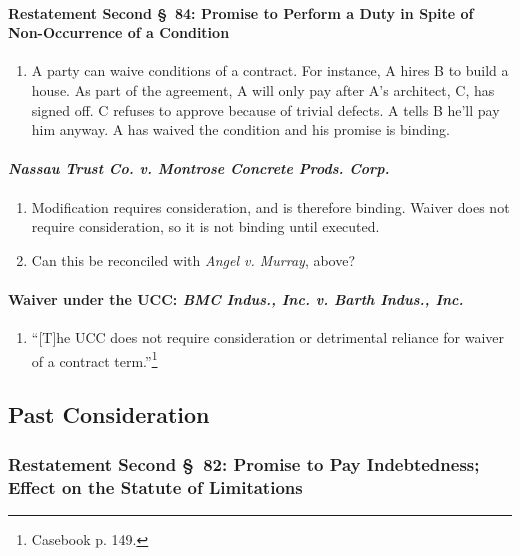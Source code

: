 \paragraph{Restatement Second \S\ 84: Promise to Perform a Duty in Spite of 
Non-Occurrence of a Condition}

\begin{enumerate}
    \item A party can waive conditions of a contract. For instance, A hires B 
    to build a house. As part of the agreement, A will only pay after A's 
    architect, C, has signed off. C refuses to approve because of trivial 
    defects. A tells B he'll pay him anyway. A has waived the condition and 
    his promise is binding.
\end{enumerate}

\paragraph{\emph{Nassau Trust Co. v. Montrose Concrete Prods. Corp.}}

\begin{enumerate}
    \item Modification requires consideration, and is therefore binding. 
    Waiver does not require consideration, so it is not binding until 
    executed.
    \item Can this be reconciled with \emph{Angel v. Murray}, above?
\end{enumerate}

\paragraph{Waiver under the UCC: \emph{BMC Indus., Inc. v. Barth Indus., 
Inc.}}

\begin{enumerate}
    \item ``[T]he UCC does not require consideration or detrimental reliance 
    for waiver of a contract term.''\footnote{Casebook p. 149.}
\end{enumerate}

\subsection{Past Consideration}

\subsubsection{Restatement Second \S\ 82: Promise to Pay Indebtedness; Effect 
on the Statute of Limitations}

